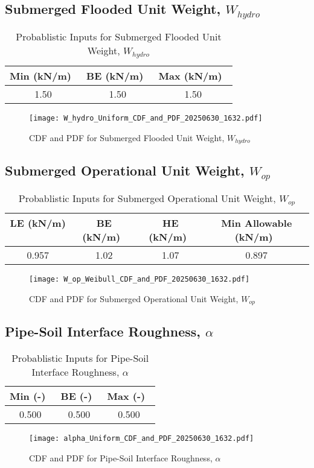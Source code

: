 \documentclass{article}
\begin{document}
\subsection*{Submerged Flooded Unit Weight, $W_{hydro}$}
\begin{table}[h!]
\centering
\caption{Probablistic Inputs for Submerged Flooded Unit Weight, $W_{hydro}$}
\begin{tabular}{|c|c|c|}
\hline
Min (kN/m)\ & BE (kN/m)\ & Max (kN/m)\ \\
\hline
1.50 & 1.50 & 1.50 \\
\hline
\end{tabular}
\end{table}
\begin{figure}[h!]
\centering
\texttt{[image: W\_hydro\_Uniform\_CDF\_and\_PDF\_20250630\_1632.pdf]}
\caption{CDF and PDF for Submerged Flooded Unit Weight, $W_{hydro}$}
\end{figure}
\clearpage
\subsection*{Submerged Operational Unit Weight, $W_{op}$}
\begin{table}[h!]
\centering
\caption{Probablistic Inputs for Submerged Operational Unit Weight, $W_{op}$}
\begin{tabular}{|c|c|c|c|}
\hline
LE (kN/m) \ & BE (kN/m)\ & HE (kN/m)\ & Min Allowable (kN/m)\ \\
\hline
0.957 & 1.02 & 1.07 & 0.897 \\
\hline
\end{tabular}
\end{table}
\begin{figure}[h!]
\centering
\texttt{[image: W\_op\_Weibull\_CDF\_and\_PDF\_20250630\_1632.pdf]}
\caption{CDF and PDF for Submerged Operational Unit Weight, $W_{op}$}
\end{figure}
\clearpage
\subsection*{Pipe-Soil Interface Roughness, $\alpha$}
\begin{table}[h!]
\centering
\caption{Probablistic Inputs for Pipe-Soil Interface Roughness, $\alpha$}
\begin{tabular}{|c|c|c|}
\hline
Min (-)\ & BE (-)\ & Max (-)\ \\
\hline
0.500 & 0.500 & 0.500 \\
\hline
\end{tabular}
\end{table}
\begin{figure}[h!]
\centering
\texttt{[image: alpha\_Uniform\_CDF\_and\_PDF\_20250630\_1632.pdf]}
\caption{CDF and PDF for Pipe-Soil Interface Roughness, $\alpha$}
\end{figure}
\clearpage
\end{document}
